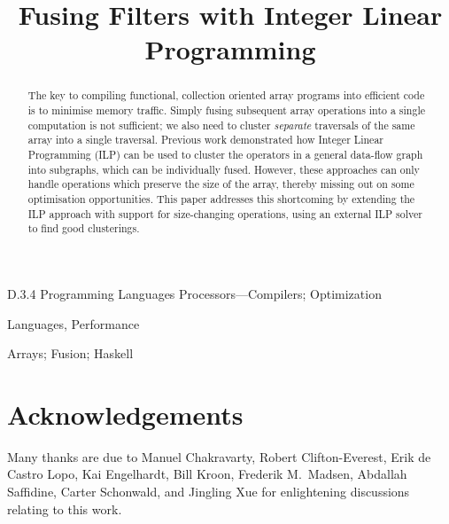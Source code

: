 \documentclass{sigplanconf}
\begin{document}
\exclusivelicense
{}


\title{Fusing Filters with Integer Linear Programming}


\maketitle
\makeatactive

\begin{abstract}
The key to compiling functional, collection oriented array programs into efficient code is to minimise memory traffic.
Simply fusing subsequent array operations into a single computation is not sufficient; we also need to cluster \emph{separate} traversals of the same array into a single traversal.
Previous work demonstrated how Integer Linear Programming (ILP) can be used to cluster the operators in a general data-flow graph into subgraphs, which can be individually fused.
However, these approaches can only handle operations which preserve the size of the array, thereby missing out on some optimisation opportunities.
This paper addresses this shortcoming by extending the ILP approach with support for size-changing operations, using an external ILP solver to find good clusterings.
\end{abstract}


\category
	{D.3.4}
	{Programming Languages}
	{Processors---Compilers; Optimization}

\terms
	Languages, Performance

\keywords
	Arrays; Fusion; Haskell









\section*{Acknowledgements}
Many thanks are due to
Manuel Chakravarty,
Robert Clifton-Everest,
Erik de Castro Lopo,
Kai Engelhardt,
Bill Kroon,
Frederik M.\ Madsen,
Abdallah Saffidine,
Carter Schonwald,
and Jingling Xue
for enlightening discussions relating to this work.



\end{document}
